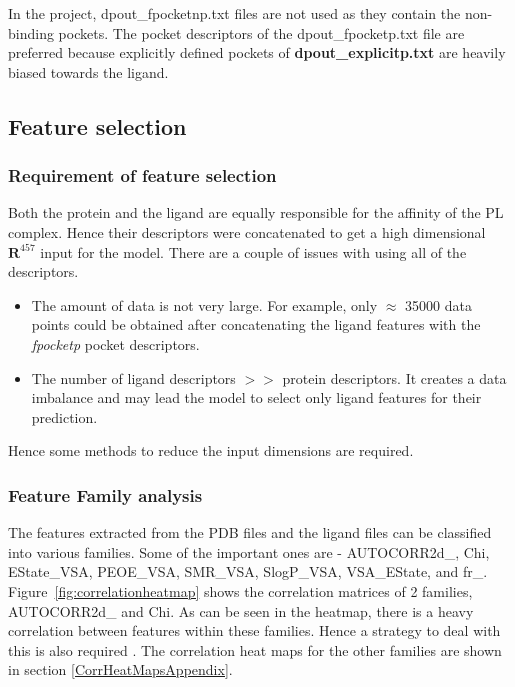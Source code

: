 \documentclass[11pt]{article}
\begin{document}
In the project,  dpout\_fpocketnp.txt files are not used as they contain the non-binding pockets.
The pocket descriptors of the dpout\_fpocketp.txt file are preferred because explicitly defined pockets of \textbf{dpout\_explicitp.txt} are heavily biased towards the ligand.

\subsection{Feature selection}
\subsubsection{Requirement of feature selection}
Both the protein and the ligand are equally responsible for the affinity of the PL complex.
Hence their descriptors were concatenated to get a high dimensional $\mathbf{R}^{457}$ input for the model.
There are a couple of issues with using all of the descriptors.
\begin{itemize}
\item The amount of data is not very large. 
For example,  only $\approx$ 35000 data points could be obtained after concatenating the ligand features with the \textit{fpocketp} pocket descriptors.
\item The number of ligand descriptors $>>$ protein descriptors.
It creates a data imbalance and may lead the model to select only ligand features for their prediction.
\end{itemize}
Hence some methods to reduce the input dimensions are required.

\subsubsection{Feature Family analysis}
\label{CorrelationAnalysis}
The features extracted from the PDB files and the ligand files can be classified into various families.
Some of the important ones are - AUTOCORR2d\_, Chi, EState\_VSA,  PEOE\_VSA,  SMR\_VSA,  SlogP\_VSA,  VSA\_EState, and fr\_.
Figure~\ref{fig:correlationheatmap} shows the correlation matrices of 2 families, AUTOCORR2d\_ and Chi.
As can be seen in the heatmap, there is a heavy correlation between features within these families.
Hence a strategy to deal with this is also required \cite{collinearityissueindifferentliterature}.
The correlation heat maps for the other families are shown in section \ref{CorrHeatMapsAppendix}.
\end{document}
